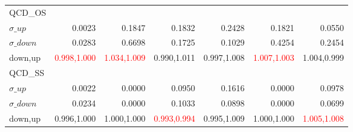 \documentclass[11pt,oneside,a4paper]{article}
\begin{document}
\begin{table}
\begin{tabular}{lrrrrrr}
\hline
QCD\_OS &  &  &  &  &  &  \\
$\sigma\_up$ & 0.0023 & 0.1847 & 0.1832 & 0.2428 & 0.1821 & 0.0550 \\
$\sigma\_down$ & 0.0283 & 0.6698 & 0.1725 & 0.1029 & 0.4254 & 0.2454 \\
down,up & \textcolor{red}{0.998,1.000} & \textcolor{red}{1.034,1.009} & 0.990,1.011 & 0.997,1.008 & \textcolor{red}{1.007,1.003} & 1.004,0.999 \\

\hline
QCD\_SS &  &  &  &  &  &  \\
$\sigma\_up$ & 0.0022 & 0.0000 & 0.0950 & 0.1616 & 0.0000 & 0.0978 \\
$\sigma\_down$ & 0.0234 & 0.0000 & 0.1033 & 0.0898 & 0.0000 & 0.0699 \\
down,up & 0.996,1.000 & 1.000,1.000 & \textcolor{red}{0.993,0.994} & 0.995,1.009 & 1.000,1.000 & \textcolor{red}{1.005,1.008} \\

\hline
\end{tabular}
\end{table}
\end{document}
